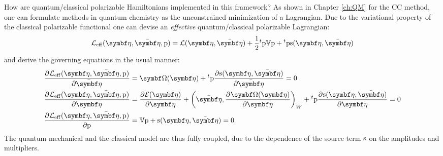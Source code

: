 How are quantum/classical polarizable Hamiltonians implemented in this
framework?
As shown in Chapter \ref{ch:QM} for the \acrshort{CC} method, one can
formulate methods in quantum chemistry as the unconstrained minimization
of a Lagrangian.
Due to the  variational property of the classical polarizable functional
one can devise an \emph{effective} quantum/classical polarizable
Lagrangian:\autocite{Lipparini2016-mo}
\begin{equation}
  \mathcal{L}_\mathrm{eff}(\vect{\eta}, \bar{\vect{\eta}}, \p) =
  \mathcal{L}(\vect{\eta}, \bar{\vect{\eta}}) +
  \frac{1}{2}{}^t\p\V\p + {}^t\p\s(\vect{\eta}, \bar{\vect{\eta}})
\end{equation}
and derive the governing equations in the usual manner:
\begin{subequations}
  \begin{align}
    \pderiv{\mathcal{L}_\mathrm{eff}(\vect{\eta}, \bar{\vect{\eta}}, \p)}{\bar{\vect{\eta}}}
    &= \mat{\Omega}(\vect{\eta}) + {}^t\p\pderiv{\s(\vect{\eta}, \bar{\vect{\eta}})}{\bar{\vect{\eta}}} = 0 \\
    \pderiv{\mathcal{L}_\mathrm{eff}(\vect{\eta}, \bar{\vect{\eta}}, \p)}{\vect{\eta}}
    &= \pderiv{\mathcal{E}(\vect{\eta})}{\vect{\eta}} +
    \scalprod[W]{\bar{\vect{\eta}}}{\pderiv{\mat{\Omega(\vect{\eta})}}{\vect{\eta}}}
    + {}^t\p\pderiv{\s(\vect{\eta}, \bar{\vect{\eta}})}{\vect{\eta}}
    = 0 \\
    \pderiv{\mathcal{L}_\mathrm{eff}(\vect{\eta}, \bar{\vect{\eta}}, \p)}{\p} &=
    \V\p + \s(\vect{\eta}, \bar{\vect{\eta}}) = 0
  \end{align}
\end{subequations}
The quantum mechanical and the classical model are thus fully coupled,
due to the dependence of the source term $\mathrm{s}$ on the amplitudes and
multipliers.

